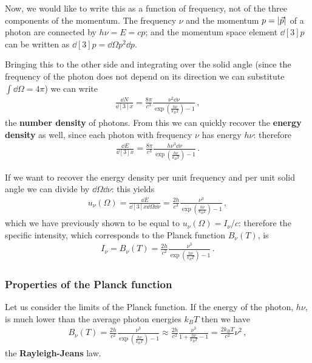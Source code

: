 \documentclass[main.tex]{subfiles}
\begin{document}
Now, we would like to write this as a function of frequency, not of the three components of the momentum. The frequency \(\nu \) and the  momentum \(p = \abs{\vec{p}}\) of a photon are connected by \(h \nu = E =  c p \); and the momentum space element \(\dd[3]{p}\) can be written as \(\dd[3]{p} = \dd{\Omega } p^2 \dd{p}\). 

Bringing this to the other side and integrating over the solid angle (since the frequency of the photon does not depend on its direction we can substitute \(\int \dd{\Omega } = 4\pi \)) we can write 
%
\begin{align}
\frac{ \dd{N}}{ \dd[3]{x}} = \frac{8\pi}{c^3} \frac{\nu^2 \dd{\nu }}{
    \exp( \frac{h \nu }{k_B T}) - 1
} 
\,,
\end{align}
%
the \textbf{number density} of photons. 
From this we can quickly recover the \textbf{energy density} as well, since each photon with frequency \(\nu \) has energy \(h \nu \): therefore 
%
\begin{align}
\frac{ \dd{E}}{ \dd[3]{x}} = \frac{8 \pi }{c^3} \frac{h \nu^3 \dd{\nu }}{\exp( \frac{h \nu }{k_B T}) - 1}
\,.
\end{align}

If we want to recover the energy density per unit frequency and per unit solid angle we can divide by \(\dd{\Omega } \dd{\nu }\): this yields 
%
\begin{align}
u_\nu (\Omega ) = \frac{ \dd{E}}{ \dd[3]{x} \dd{\Omega } \dd{\nu }} = \frac{2h}{c^3} \frac{\nu^3}{\exp( \frac{h \nu }{k_B T}) - 1}
\,,
\end{align}
%
which we have previously shown to be equal to \(u_\nu (\Omega ) = I_\nu / c\): therefore the specific intensity, which corresponds to the Planck function \(B_\nu (T)\), is 
%
\begin{align}
I_\nu = B_\nu (T) =  \frac{2h}{c^2} \frac{\nu^3}{\exp( \frac{h \nu }{k_B T}) - 1}
\,.
\end{align}

\subsubsection{Properties of the Planck function}

Let us consider the limits of the Planck function. If the energy of the photon, \(h \nu \), is much lower than the average photon energies \(k_B T\) then we have 
%
\begin{align}
B_\nu (T) 
= \frac{2h}{c^2} \frac{\nu^3}{\exp( \frac{h \nu }{k_B T}) - 1}
\approx \frac{2h}{c^2} \frac{\nu^3}{1 + \frac{h \nu }{k_B T} - 1}
= \frac{2 k_B T}{c^2} \nu^2 
\,,
\end{align}
%
the \textbf{Rayleigh-Jeans} law. 
\end{document}
